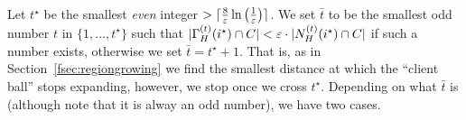 \def\t{\bar{t}}
Let $t^\star$ be the smallest {\em even} integer $> \lceil\frac{8}{\varepsilon}\ln\left(\frac{1}{\varepsilon}\right)\rceil$. We set $\t$ to be the smallest odd number $t$ in $\{1,\ldots,t^\star\}$ such that $|\Gamma^{(t)}_H(i^\star)\cap C| < \varepsilon\cdot |N^{(t)}_H(i^\star)\cap C|$ if such a number exists, otherwise we set $\t = t^\star + 1$.  That is, as in Section~\ref{fsec:regiongrowing} we find the smallest distance at which the ``client ball'' stops expanding, however, we stop once we cross $t^\star$. Depending on what $\t$ is (although note that it is alway an odd number), we have two cases.
%
